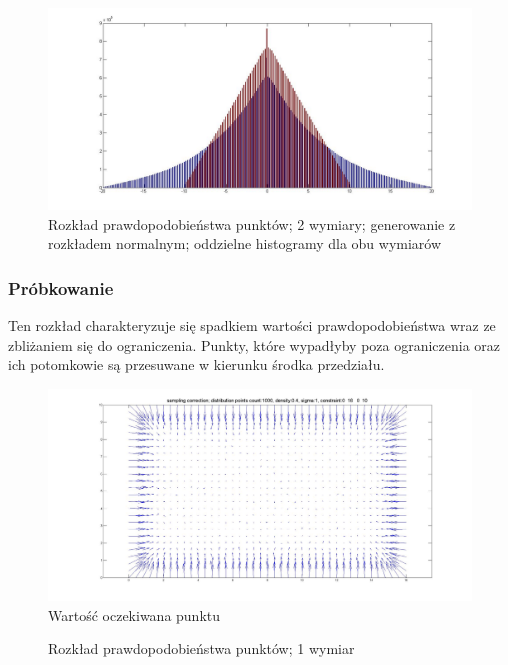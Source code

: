 \documentclass{mini}
\begin{document}
\begin{figure}[H]
\centering
\includegraphics[width=\textwidth]{ri_n_10M_2__20_20__10_10_4_1D}
\caption{Rozkład prawdopodobieństwa punktów; 2 wymiary; generowanie z rozkładem normalnym; oddzielne histogramy dla obu wymiarów}
\label{bladzenie:reinicjacja2ds}
\end{figure}

\subsubsection*{Próbkowanie}
Ten rozkład charakteryzuje się spadkiem wartości prawdopodobieństwa wraz ze zbliżaniem się do ograniczenia. Punkty, które wypadłyby poza ograniczenia oraz ich potomkowie są przesuwane w kierunku środka przedziału.

\begin{figure}[H]
\centering
\includegraphics[width=\textwidth]{sampling2dprzesuniecie}
\caption{Wartość oczekiwana punktu}
\end{figure}

\begin{figure}[H]
\centering
{}
\quad
{}
\caption{Rozkład prawdopodobieństwa punktów; 1 wymiar}
\end{figure}
\end{document}
